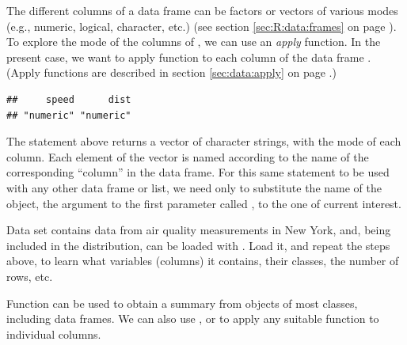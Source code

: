 \documentclass[krantz2]{krantz}\usepackage{knitr}
\begin{document}
The different columns of a data frame can be factors or vectors of various modes (e.g.,  numeric, logical, character, etc.) (see section \ref{sec:R:data:frames} on page \pageref{sec:R:data:frames}).
To explore the mode of the columns of , we can use an \emph{apply} function. In the present case, we want to apply function  to each column of the data frame . (Apply functions are described in section \ref{sec:data:apply} on page \pageref{sec:data:apply}.)

\begin{knitrout}\footnotesize
{}\color{fgcolor}\begin{kframe}
\begin{alltt}
\hlstd{(}   
\end{alltt}
\begin{verbatim}
##     speed      dist 
## "numeric" "numeric"
\end{verbatim}
\end{kframe}
\end{knitrout}

The statement above returns a vector of character strings, with the mode of each column. Each element of the vector is named according to the name of the corresponding ``column'' in the data frame. For this same statement to be used with any other data frame or list, we need only to substitute the name of the object, the argument to the first parameter called , to the one of current interest.

\begin{playground}
Data set  contains data from air quality measurements in New York, and, being included in the \Rpgrm distribution, can be loaded with . Load it, and repeat the steps above, to learn what variables (columns) it contains, their classes, the number of rows, etc.
\end{playground}

Function  can be used to obtain a summary from objects of most \Rlang classes, including data frames. We can also use ,  or  to apply any suitable function to individual columns.
\end{document}
